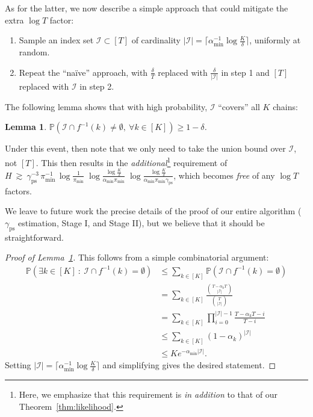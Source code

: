 \documentclass[twoside]{article}
\providecommand{\ceil}[2][-1]{
\ensuremath{\mathinner{
\ifthenelse{\equal{#1}{-1}}{ %
\!\left\lceil#2\right\rceil}{}
\ifthenelse{\equal{#1}{0}}{ %
\lceil#2\rceil}{}
\ifthenelse{\equal{#1}{1}}{ %
\!\bigl\lceil#2\bigr\rceil}{}
\ifthenelse{\equal{#1}{2}}{ %
\!\Bigl\lceil#2\Bigr\rceil}{}
\ifthenelse{\equal{#1}{3}}{ %
\!\biggl\lceil#2\biggr\rceil}{}
\ifthenelse{\equal{#1}{4}}{ %
\!\Biggl\lceil#2\Biggr\rceil}{}
}} %
}
\def\gI{{\mathcal{I}}}
\def\sP{{\mathbb{P}}}
\theoremstyle{plain}
\newtheorem{lemma}{Lemma}[section]
\def\ceil#1{\lceil #1 \rceil}
\newcommand{\ps}{\mathrm{ps}}
\begin{document}
As for the latter, we now describe a simple approach that could mitigate the extra $\log T$ factor:
\begin{enumerate}
    \item Sample an index set $\gI \subset [T]$ of cardinality $|\gI| = \ceil{\alpha_{\min}^{-1} \log\frac{K}{\delta}}$, uniformly at random.
    \item Repeat the ``na\"{i}ve'' approach, with $\frac{\delta}{T}$ replaced with $\frac{\delta}{|\gI|}$ in step 1 and $[T]$ replaced with $\gI$ in step 2.
\end{enumerate}
The following lemma shows that with high probability, $\gI$ ``covers'' all $K$ chains:
\begin{lemma}
\label{lem:cover}
    $\sP\left( \gI \cap f^{-1}(k) \neq \emptyset, \ \forall k \in [K] \right) \geq 1 - \delta$.
\end{lemma}
Under this event, then note that we only need to take the union bound over $\gI$, not $[T]$.
This then results in the \textit{additional}\footnote{Here, we emphasize that this requirement is \textit{in addition} to that of our Theorem~\ref{thm:likelihood}.} requirement of $H \ \gtrsim\ \gamma_\ps^{-3}\,\pi_{\min}^{-1}\,\log\!\frac{1}{\pi_{\min}}\;\log\!\frac{\log\frac{K}{\delta}}{\alpha_{\min}\pi_{\min}}\;\log\!\frac{\log\frac{K}{\delta}}{\alpha_{\min}\pi_{\min}\gamma_\ps}$, which becomes \textit{free} of any $\log T$ factors.

We leave to future work the precise details of the proof of our entire algorithm ($\gamma_\ps$ estimation, Stage I, and Stage II), but we believe that it should be straightforward.

\begin{proof}[Proof of Lemma~\ref{lem:cover}]
    This follows from a simple combinatorial argument:
    \begin{align*}
        \sP\left( \exists k \in [K] \ : \ \gI \cap f^{-1}(k) = \emptyset \right) &\leq \sum_{k \in [K]} \sP\left( \gI \cap f^{-1}(k) = \emptyset \right) \tag{union bound} \\
        &= \sum_{k \in [K]} \frac{\binom{T - \alpha_k T}{|\gI|}}{\binom{T}{|\gI|}} \\
        &= \sum_{k \in [K]} \prod_{i=0}^{|\gI|-1} \frac{T - \alpha_k T - i}{T - i} \\
        &\leq \sum_{k \in [K]} (1 - \alpha_k)^{|\gI|} \tag{the multiplicands monotonically decrease with $i$} \\
        &\leq K e^{-\alpha_{\min} |\gI|}.
    \end{align*}
    Setting $|\gI| = \ceil{\alpha_{\min}^{-1} \log\frac{K}{\delta}}$ and simplifying gives the desired statement.
\end{proof}
\end{document}
